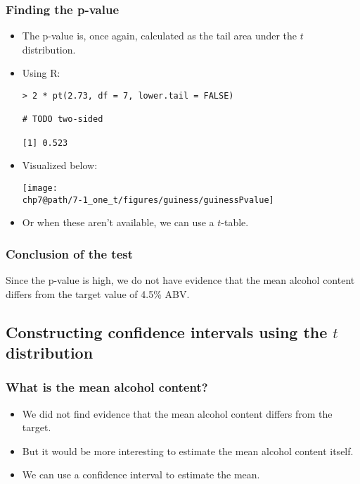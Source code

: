\documentclass[slidestop,compress,mathserif]{beamer}
\makeatletter
\def\chp7@path{../../Chp 7}
\makeatother
\begin{document}

\begin{frame}[fragile]
\frametitle{Finding the p-value}

\begin{itemize}
\item The p-value is, once again, calculated as the tail area under the $t$ distribution.
\pause
\item Using R:
\begin{verbatim}
> 2 * pt(2.73, df = 7, lower.tail = FALSE)

# TODO two-sided

[1] 0.523
\end{verbatim}
\pause
\item Visualized below:
\begin{center}
\texttt{[image: \\chp7@path/7-1\_one\_t/figures/guiness/guinessPvalue]}
\end{center}
\pause
\item Or when these aren't available, we can use a $t$-table.
\end{itemize}
\end{frame}




\begin{frame}
\frametitle{Conclusion of the test}


\pause

Since the p-value is high, we do not have evidence that the mean alcohol content differs from the target value of 4.5\% ABV.

\end{frame}


\subsection{Constructing confidence intervals using the \texorpdfstring{$t$}{t} distribution}



\begin{frame}
\frametitle{What is the mean alcohol content?}

\begin{itemize}
\item We did not find evidence that the mean alcohol content differs from the target.
\pause
\item But it would be more interesting to estimate the mean alcohol content itself.
\pause
\item We can use a confidence interval to estimate the mean.
\end{itemize}
\end{frame}
\end{document}
